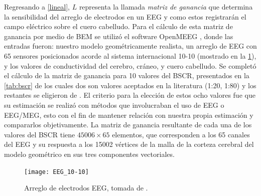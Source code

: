 Regresando a \cref{lineal}, $L$ representa la llamada \emph{matriz de ganancia} que determina la sensibilidad del arreglo de electrodos en un EEG y como estos registrarán el campo eléctrico sobre el cuero cabelludo.
Para el cálculo de esta matriz de ganancia por medio de BEM se utilizó el software OpenMEEG \cite{open,open2}, donde las entradas fueron: nuestro modelo geométricamente realista, un arreglo de EEG con 65 sensores posicionados acorde al sistema internacional 10-10 (mostrado en la \cref{fig:EEG10-10}), y los valores de conductividad del cerebro, cráneo, y cuero cabelludo.
Se completó el cálculo de la matriz de ganancia para 10 valores del BSCR, presentados en la \cref{tab:bscr} de los cuales dos son valores aceptados en la literatura (1:20, 1:80) y los restantes se eligieron de \cite{McCann2019}.
El criterio para la elección de estos ocho valores fue que su estimación se realizó con métodos que involucraban el uso de EEG o EEG/MEG, esto con el fin de mantener relación con nuestra propia estimación y compararlos objetivamente.
La matriz de ganancia resultante de cada una de los valores del BSCR tiene $45006 \times 65$ elementos, que corresponden a los 65 canales del EEG y su respuesta a los 15002 vértices de la malla de la corteza cerebral del modelo geométrico en sus tres componentes vectoriales.

\begin{figure}[p]
	\centering
	\texttt{[image: EEG\_10-10]}
	\caption{Arreglo de electrodos EEG, tomada de \cite{krolEnglishEEGElectrode2020}.}
	\label{fig:EEG10-10}
\end{figure}

